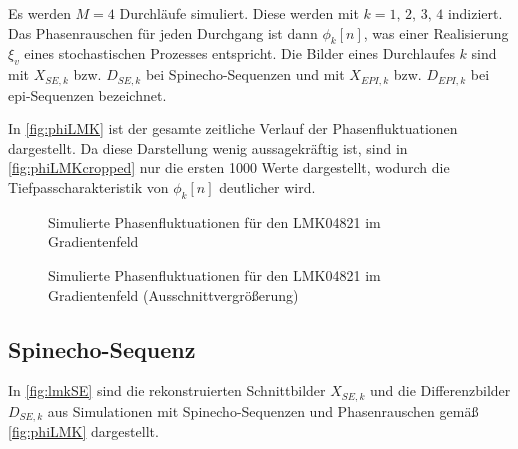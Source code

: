 Es werden $M=4$ Durchläufe simuliert. Diese werden mit $k=1,\,2,\,3,\,4$ indiziert. Das Phasenrauschen für jeden Durchgang ist dann $\phi_k[n]$, was einer Realisierung $\xi_v$ eines stochastischen Prozesses entspricht. Die Bilder eines Durchlaufes $k$ sind mit $X_{SE,k}$ bzw. $D_{SE,k}$ bei Spinecho-Sequenzen und mit $X_{EPI,k}$ bzw. $D_{EPI,k}$ bei \gls{epi}-Sequenzen bezeichnet.

In \autoref{fig:phiLMK} ist der gesamte zeitliche Verlauf der Phasenfluktuationen dargestellt. Da diese Darstellung wenig aussagekräftig ist, sind in \autoref{fig:phiLMKcropped} nur die ersten 1000 Werte dargestellt, wodurch die Tiefpasscharakteristik von $\phi_k[n]$ deutlicher wird.

\begin{figure}[H]
	\centering
	\caption[Simulierte Phasenfluktuationen (LMK04821 in Gradientenfeld)]{Simulierte Phasenfluktuationen für den LMK04821 im Gradientenfeld}
	\label{fig:phiLMK}
\end{figure}

\begin{figure}[H]
	\centering
	\caption[Simulierte Phasenfluktuationen (LMK04821 in Gradientenfeld) (Vergrößerung)]{Simulierte Phasenfluktuationen für den LMK04821 im Gradientenfeld (Ausschnittvergrößerung)}
	\label{fig:phiLMKcropped}
\end{figure}

\clearpage
\subsection{Spinecho-Sequenz}
In \autoref{fig:lmkSE} sind die rekonstruierten Schnittbilder $X_{SE,k}$ und die Differenzbilder $D_{SE,k}$ aus Simulationen mit Spinecho-Sequenzen und Phasenrauschen gemäß \autoref{fig:phiLMK} dargestellt.

